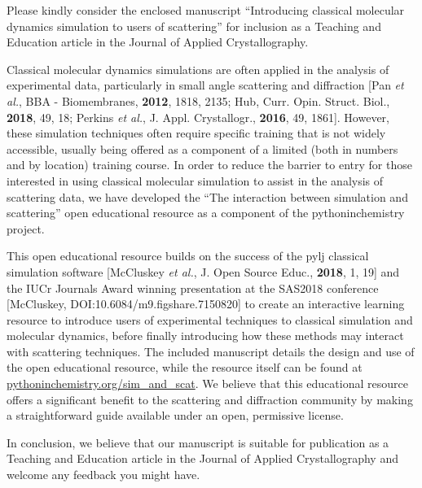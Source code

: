 \documentclass[10pt,stdletter,dateno,sigleft,a4paper]{newlfm} %
\begin{document}
\begin{newlfm}


Please kindly consider the enclosed manuscript ``Introducing classical molecular dynamics simulation to users of scattering'' for inclusion as a Teaching and Education article in the Journal of Applied Crystallography.

Classical molecular dynamics simulations are often applied in the analysis of experimental data, particularly in small angle scattering and diffraction [Pan \emph{et al.}, BBA - Biomembranes, \textbf{2012}, 1818, 2135; Hub, Curr. Opin. Struct. Biol., \textbf{2018}, 49, 18; Perkins \emph{et al.}, J. Appl. Crystallogr., \textbf{2016}, 49, 1861].
However, these simulation techniques often require specific training that is not widely accessible, usually being offered as a component of a limited (both in numbers and by location) training course.
In order to reduce the barrier to entry for those interested in using classical molecular simulation to assist in the analysis of scattering data, we have developed the ``The interaction between simulation and scattering'' open educational resource as a component of the pythoninchemistry project.

This open educational resource builds on the success of the pylj classical simulation software [McCluskey \emph{et al.}, J. Open Source Educ., \textbf{2018}, 1, 19] and the IUCr Journals Award winning presentation at the SAS2018 conference [McCluskey, DOI:10.6084/m9.figshare.7150820] to create an interactive learning resource to introduce users of experimental techniques to classical simulation and molecular dynamics, before finally introducing how these methods may interact with scattering techniques.
The included manuscript details the design and use of the open educational resource, while the resource itself can be found at \url{pythoninchemistry.org/sim_and_scat}.
We believe that this educational resource offers a significant benefit to the scattering and diffraction community by making a straightforward guide available under an open, permissive license.

In conclusion, we believe that our manuscript is suitable for publication as a Teaching and Education article in the Journal of Applied Crystallography and welcome any feedback you might have.


\end{newlfm}
\end{document}
